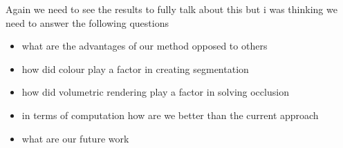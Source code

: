 Again we need to see the results to fully talk about this but i was thinking we need to answer the following questions

\begin{itemize}
    \item what are the advantages of our method opposed to others
    \item how did colour play a factor in creating segmentation
    \item how did volumetric rendering play a factor in solving occlusion
    \item in terms of computation how are we better than the current approach 
    \item what are our future work
\end{itemize}